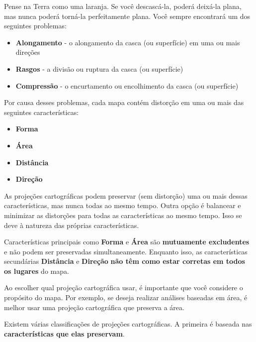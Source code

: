 \documentclass[
  portuguese,
]{krantz}
\providecommand{\tightlist}{%
  \setlength{\itemsep}{0pt}\setlength{\parskip}{0pt}}
\begin{document}
Pense na Terra como uma laranja. Se você descascá-la, poderá deixá-la plana, mas nunca poderá torná-la perfeitamente plana. Você sempre encontrará um dos seguintes problemas:

\begin{itemize}
\tightlist
\item
  \textbf{Alongamento} - o alongamento da casca (ou superfície) em uma ou mais direções
\item
  \textbf{Rasgos} - a divisão ou ruptura da casca (ou superfície)
\item
  \textbf{Compressão} - o encurtamento ou encolhimento da casca (ou superfície)
\end{itemize}

Por causa desses problemas, cada mapa contém distorção em uma ou mais das seguintes características:

\begin{itemize}
\tightlist
\item
  \textbf{Forma}
\item
  \textbf{Área}
\item
  \textbf{Distância}
\item
  \textbf{Direção}
\end{itemize}

As projeções cartográficas podem preservar (sem distorção) uma ou mais dessas características, mas nunca todas ao mesmo tempo. Outra opção é balancear e minimizar as distorções para todas as características ao mesmo tempo. Isso se deve à natureza das próprias características.

Características principais como \textbf{Forma} e \textbf{Área} são \textbf{mutuamente excludentes} e não podem ser preservadas simultaneamente. Enquanto isso, as características secundárias \textbf{Distância} e \textbf{Direção} \textbf{não têm como estar corretas em todos os lugares} do mapa.

Ao escolher qual projeção cartográfica usar, é importante que você considere o propósito do mapa. Por exemplo, se deseja realizar análises baseadas em área, é melhor usar uma projeção cartográfica que preserva a área.

Existem várias classificações de projeções cartográficas. A primeira é baseada nas \textbf{características que elas preservam}.
\end{document}
